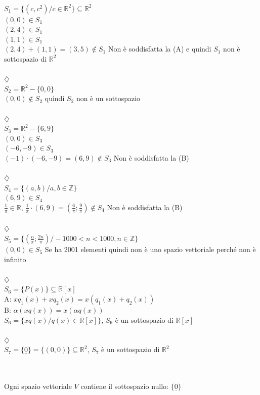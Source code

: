 \begin{es}
  \phantom{}\\
  $S_1=\{(c,c^2)/c\in\mathbb{R}^2\}\subseteq\mathbb{R}^2$\\
  $(0,0)\in S_1$\\ $(2,4)\in S_1$\\ $(1,1)\in
  S_1$\\ $(2,4)+(1,1)=(3,5)\notin S_1$ Non è soddisfatta la (A) e
  quindi $S_1$ non è sottospazio di $\mathbb{R}^2$\\\\$\diamondsuit$\\
  $S_2=\mathbb{R}^2-\{0,0\}$\\ $(0,0)\notin S_2$ quindi $S_2$ non è
  un sottospazio\\\\$\diamondsuit$\\
  $S_3=\mathbb{R}^2-\{6,9\}$\\ $(0,0)\in S_3$\\ $(-6,-9)\in
  S_3$\\ $(-1)\cdot(-6,-9)=(6,9)\notin S_3$ Non è soddisfatta la
  (B)\\\\$\diamondsuit$\\
  $S_4=\{(a,b)/a,b\in\mathbb{Z}\}$\\ $(6,9)\in
  S_4$\\ $\frac{1}{\pi}\in\mathbb{R}$,
  $\frac{1}{\pi}\cdot(6,9)=(\frac{6}{\pi};\frac{9}{\pi})\notin S_4$
  Non è soddisfatta la (B)\\\\$\diamondsuit$\\
  $S_5=\{(\frac{n}{\pi};\frac{2n}{\pi})/-1000<n<1000, n\in\mathbb{Z}\}$\\
  $(0,0)\in S_5$ Se ha 2001 elementi quindi non è uno spazio
  vettoriale perché non è infinito\\\\$\diamondsuit$\\
  $S_6=\{P(x)\}\subseteq\mathbb{R}[x]$\\ A:
  $xq_1(x)+xq_2(x)=x(q_1(x)+q_2(x))$\\ B: $\alpha(xq(x))=x(\alpha
  q(x))$\\ $S_6=\{xq(x)/q(x)\in\mathbb{R}[x]\}$, $S_6$ è un
  sottospazio di $\mathbb{R}[x]$\\\\$\diamondsuit$\\
  $S_7=\{\underline{0}\}=\{(0,0)\}\subseteq\mathbb{R}^2$, $S_7$ è un
  sottospazio di $\mathbb{R}^2$
\end{es}
\phantom{text}\\
\phantom{text}\\
Ogni spazio vettoriale $V$ contiene il sottospazio nullo: $\{\underline{0}\}$

